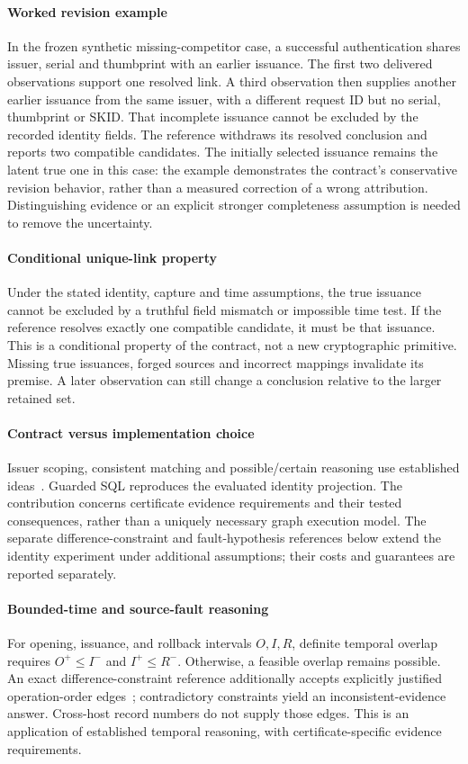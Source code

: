 \paragraph{Worked revision example}
In the frozen synthetic missing-competitor case, a successful authentication shares issuer, serial and thumbprint with an earlier issuance. The first two delivered observations support one resolved link. A third observation then supplies another earlier issuance from the same issuer, with a different request ID but no serial, thumbprint or SKID. That incomplete issuance cannot be excluded by the recorded identity fields. The reference withdraws its resolved conclusion and reports two compatible candidates. The initially selected issuance remains the latent true one in this case: the example demonstrates the contract's conservative revision behavior, rather than a measured correction of a wrong attribution. Distinguishing evidence or an explicit stronger completeness assumption is needed to remove the uncertainty.

\paragraph{Conditional unique-link property}
Under the stated identity, capture and time assumptions, the true issuance cannot be excluded by a truthful field mismatch or impossible time test. If the reference resolves exactly one compatible candidate, it must be that issuance. This is a conditional property of the contract, not a new cryptographic primitive. Missing true issuances, forged sources and incorrect mappings invalidate its premise. A later observation can still change a conclusion relative to the larger retained set.

\paragraph{Contract versus implementation choice}
Issuer scoping, consistent matching and possible/certain reasoning use established ideas~\cite{amarilli2017order,elmagarmid2007duplicate}. Guarded SQL reproduces the evaluated identity projection. The contribution concerns certificate evidence requirements and their tested consequences, rather than a uniquely necessary graph execution model. The separate difference-constraint and fault-hypothesis references below extend the identity experiment under additional assumptions; their costs and guarantees are reported separately.

\paragraph{Bounded-time and source-fault reasoning}
For opening, issuance, and rollback intervals $O,I,R$, definite temporal overlap requires $O^{+}\le I^{-}$ and $I^{+}\le R^{-}$. Otherwise, a feasible overlap remains possible. An exact difference-constraint reference additionally accepts explicitly justified operation-order edges~\cite{dechter1991temporal,amarilli2017order}; contradictory constraints yield an inconsistent-evidence answer. Cross-host record numbers do not supply those edges. This is an application of established temporal reasoning, with certificate-specific evidence requirements.

